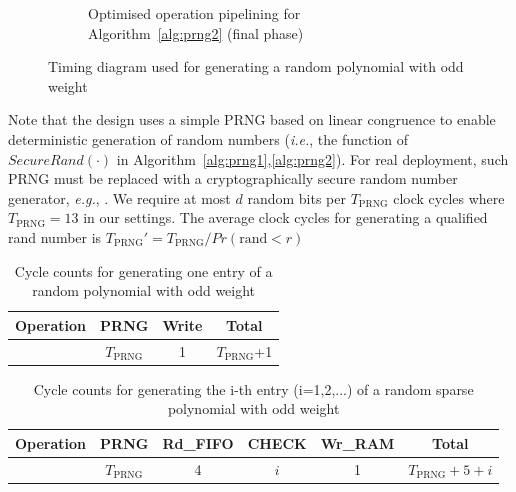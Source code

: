 \documentclass[runningheads]{llncs}
\begin{document}
\begin{figure}[!tb]
\begin{subfigure}[t]{0.45\textwidth}
\caption{Optimised operation pipelining for Algorithm~\ref{alg:prng2} (final phase) }
\label{fig:pipeline_rng3}
\end{subfigure}
\caption{Timing diagram used for generating a random polynomial with odd weight}
\end{figure}


Note that the design uses a simple PRNG based on linear congruence to enable deterministic generation of random numbers (\textit{i.e.}, the function of $SecureRand(\cdot)$ in Algorithm~\ref{alg:prng1},\ref{alg:prng2}). For real deployment,
such PRNG must be replaced with a cryptographically secure random number
generator, \textit{e.g.}, \cite{laue2007compact,cherkaoui2013very}. We require at most $d$ random bits per $T_{\text{PRNG}}$ clock cycles where $T_{\text{PRNG}}=13$ in our settings.
The average clock cycles for generating a qualified rand number is $T_{\text{PRNG}}' = T_{\text{PRNG}}/Pr(\text{rand} < r)$

\begin{table}[!tb]\centering
\caption{Cycle counts for generating  one entry of a random polynomial with odd weight}
\begin{tabular}{c|c|c|c}
  \hline
  Operation & PRNG & Write & Total \\\hline
   & $T_{\text{PRNG}}$ & 1  & $T_{\text{PRNG}}$+1 \\
  \hline
\end{tabular}
\end{table}

\begin{table}[!tb]\centering
\caption{Cycle counts for generating  the i-th entry (i=1,2,...) of a random sparse polynomial with odd weight}
\begin{tabular}{c|c|c|c|c|c}
  \hline
  Operation & PRNG & Rd\_FIFO & CHECK &Wr\_RAM & Total \\\hline
   & $T_{\text{PRNG}}$ & 4  & $i$ & 1 &$T_{\text{PRNG}}+5+i$ \\
  \hline
\end{tabular}
\end{table}
\end{document}
